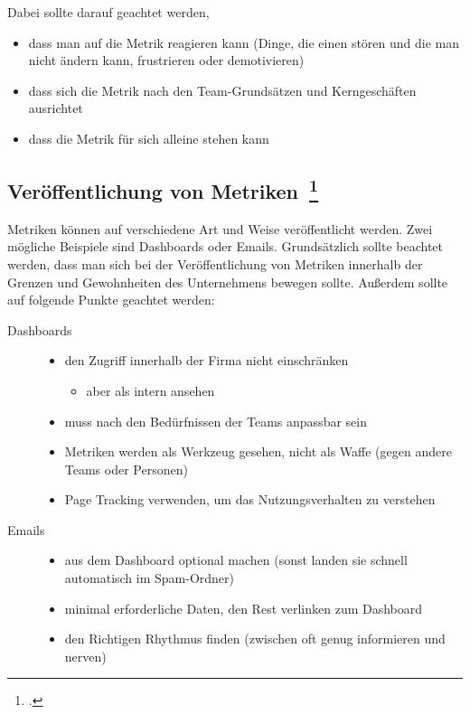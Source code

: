 Dabei sollte darauf geachtet werden,
\begin{itemize}
  \item dass man auf die Metrik reagieren kann (Dinge, die einen stören und die man nicht ändern kann, frustrieren oder demotivieren)
  \item dass sich die Metrik nach den Team-Grundsätzen und Kerngeschäften ausrichtet
  \item dass die Metrik für sich alleine stehen kann
\end{itemize}

\subsection[Veröffentlichung von Metriken]{Veröffentlichung von Metriken~\footcite[vgl.][S.177ff]{davis_agile_2015}}

Metriken können auf verschiedene Art und Weise veröffentlicht werden. Zwei mögliche Beispiele sind Dashboards oder Emails.
Grundsätzlich sollte beachtet werden, dass man sich bei der Veröffentlichung von Metriken innerhalb der Grenzen und Gewohnheiten des Unternehmens bewegen sollte.
Außerdem sollte auf folgende Punkte geachtet werden:

\begin{description}
  \item[Dashboards] \hfill
  \begin{itemize}[noitemsep]
    \item den Zugriff innerhalb der Firma nicht einschränken
    \begin{itemize}[noitemsep]
      \item aber als intern ansehen
    \end{itemize}
    \item muss nach den Bedürfnissen der Teams anpassbar sein
    \item Metriken werden als Werkzeug gesehen, nicht als Waffe (gegen andere Teams oder Personen)
    \item Page Tracking verwenden, um das Nutzungsverhalten zu verstehen
  \end{itemize}
  \item[Emails] \hfill
  \begin{itemize}[noitemsep]
    \item aus dem Dashboard optional machen (sonst landen sie schnell automatisch im Spam-Ordner)
    \item minimal erforderliche Daten, den Rest verlinken zum Dashboard
    \item den Richtigen Rhythmus finden (zwischen oft genug informieren und nerven)
  \end{itemize}
\end{description}

